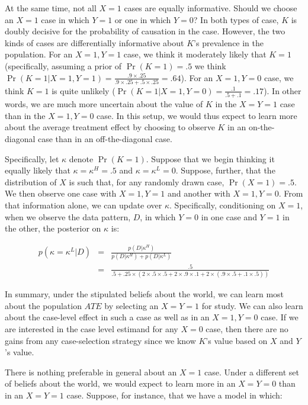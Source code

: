 \documentclass[
  12pt,
]{book}
\begin{document}
At the same time, not all \(X=1\) cases are equally informative. Should we choose an \(X=1\) case in which \(Y=1\) or one in which \(Y=0\)? In both types of case, \(K\) is doubly decisive for the probability of causation in the case. However, the two kinds of cases are differentially informative about \(K\)'s prevalence in the population. For an \(X=1, Y=1\) case, we think it moderately likely that \(K=1\) (specifically, assuming a prior of \(\Pr(K=1)=.5\) we think \(\Pr(K=1 | X=1, Y=1) = \frac{.9 \times .25}{.9 \times .25+.5 \times.25}=.64\)). For an \(X=1, Y=0\) case, we think \(K=1\) is quite unlikely (\(\Pr(K=1 | X=1, Y=0) = \frac{.1}{.5+.1}=.17\)). In other words, we are much more uncertain about the value of \(K\) in the \(X=Y=1\) case than in the \(X=1, Y=0\) case. In this setup, we would thus expect to learn more about the average treatment effect by choosing to observe \(K\) in an on-the-diagonal case than in an off-the-diagonal case.

Specifically, let \(\kappa\) denote \(\Pr(K=1)\). Suppose that we begin thinking it equally likely that \(\kappa=\kappa^H = .5\) and \(\kappa=\kappa^L=0\). Suppose, further, that the distribution of \(X\) is such that, for any randomly drawn case, \(\Pr(X=1) = .5\). We then observe one case with \(X=1, Y=1\) and another with \(X=1, Y=0\). From that information alone, we can update over \(\kappa\). Specifically, conditioning on \(X=1\), when we observe the data pattern, \(D\), in which \(Y=0\) in one case and \(Y=1\) in the other, the posterior on \(\kappa\) is:

\begin{eqnarray}
p(\kappa = \kappa^L|D) &=&  \frac{p(D|\kappa^H)}{p(D|\kappa^H)+p(D|\kappa^L)}\\
&=&\frac{.5}{.5 + .25\times(2\times.5\times.5 + 2\times.9\times.1 + 2\times(.9\times.5 +.1\times.5))}
\end{eqnarray}

In summary, under the stipulated beliefs about the world, we can learn most about the population \(ATE\) by selecting an \(X=Y=1\) for study. We can also learn about the case-level effect in such a case as well as in an \(X=1, Y=0\) case. If we are interested in the case level estimand for any \(X=0\) case, then there are no gains from any case-selection strategy since we know \(K\)'s value based on \(X\) and \(Y\)'s value.

There is nothing preferable in general about an \(X=1\) case. Under a different set of beliefs about the world, we would expect to learn more in an \(X=Y=0\) than in an \(X=Y=1\) case. Suppose, for instance, that we have a model in which:
\end{document}
